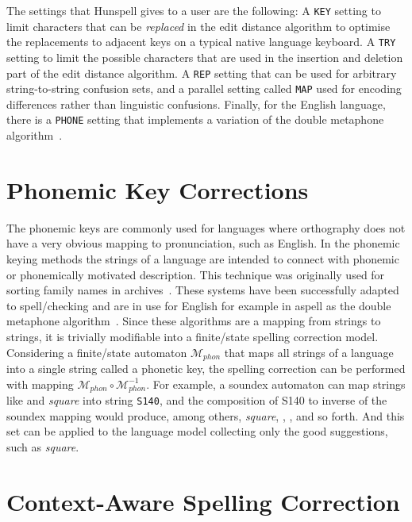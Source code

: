 \documentclass[officiallayout]{unihelcompling}
\newcommand\misspelt{\bgroup\markoverwith
{\textcolor{red}{\lower3.5pt\hbox{\sixly \char58}}}\ULon}
\begin{document}
The settings that Hunspell gives to a user are the following: A \texttt{KEY}
setting to limit characters that can be \emph{replaced} in the edit distance
algorithm to optimise the replacements to adjacent keys on a typical native
language keyboard. A \texttt{TRY} setting to limit the possible characters
that are used in the insertion and deletion part of the edit distance
algorithm. A \texttt{REP} setting that can be used for arbitrary
string-to-string confusion sets, and a parallel setting called \texttt{MAP}
used for encoding differences rather than linguistic confusions.  Finally, for
the English language, there is a \texttt{PHONE} setting that implements a
variation of the double metaphone algorithm~\citep{philips2000double}.

\section{Phonemic Key Corrections}
\label{sec:phonemic}

The phonemic keys are commonly used for languages where orthography does not
have a very obvious mapping to pronunciation, such as English. In the phonemic
keying methods the strings of a language are intended to connect with phonemic
or phonemically motivated description. This technique was originally used for
sorting family names in archives~\citep{russell1918soundex}. These systems have
been successfully adapted to spell\-/checking and are in use for English for
example in aspell as the double metaphone algorithm~\citep{philips2000double}.
Since these algorithms are a mapping from strings to strings, it is trivially
modifiable into a finite\-/state spelling correction model. Considering a
finite\-/state automaton $\mathcal{M}_{phon}$ that maps all strings of a
language into a single string called a phonetic key, the spelling correction
can be performed with mapping $\mathcal{M}_{phon} \circ
\mathcal{M}_{phon}^{-1}$.  For example, a soundex automaton can map strings
like \misspelt{squer} and \emph{square} into string \texttt{S140}, and the
composition of S140 to inverse of the soundex mapping would produce, among
others, \emph{square}, \misspelt{squer}, \misspelt{sqr}, \misspelt{sqrrr} and
so forth. And this set can be applied to the language model collecting only the
good suggestions, such as \emph{square}.

\section{Context-Aware Spelling Correction}
\label{sec:context}
\end{document}

